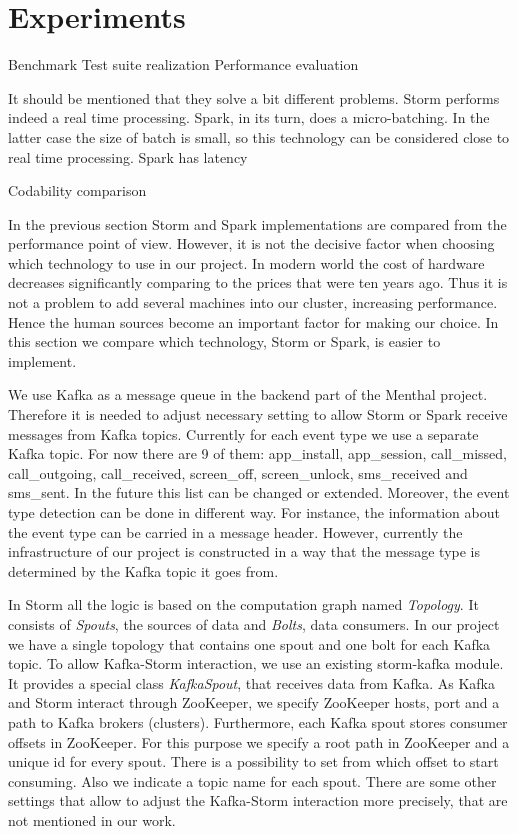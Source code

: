 \chapter{Experiments}
\label{chap:experiments}

Benchmark
Test suite realization
Performance evaluation

It should be mentioned that they solve a bit different problems.
Storm performs indeed a real time processing.
Spark, in its turn, does a micro-batching.
In the latter case the size of batch is small, so this technology can be considered close to real time processing.
Spark has latency

Codability comparison


In the previous section Storm and Spark implementations are compared from the performance point of view.
However, it is not the decisive factor when choosing which technology to use in our project.
In modern world the cost of hardware decreases significantly comparing to the prices that were ten years ago.
Thus it is not a problem to add several machines into our cluster, increasing performance.
Hence the human sources become an important factor for making our choice.
In this section we compare which technology, Storm or Spark, is easier to implement.

We use Kafka as a message queue in the backend part of the Menthal project.
Therefore it is needed to adjust necessary setting to allow Storm or Spark receive messages from Kafka topics.
Currently for each event type we use a separate Kafka topic.
For now there are 9 of them: app\_install, app\_session, call\_missed, call\_outgoing, call\_received, screen\_off, screen\_unlock, sms\_received and sms\_sent.  
In the future this list can be changed or extended.
Moreover, the event type detection can be done in different way.
For instance, the information about the event type can be carried in a message header.
However, currently the infrastructure of our project is constructed in a way that the message type is determined by the Kafka topic it goes from.

In Storm all the logic is based on the computation graph named \textit{Topology}.
It consists of \textit{Spouts}, the sources of data and \textit{Bolts}, data consumers.
In our project we have a single topology that contains one spout and one bolt for each Kafka topic.
To allow Kafka-Storm interaction, we use an existing storm-kafka module.
It provides a special class \textit{KafkaSpout}, that receives data from Kafka.
As Kafka and Storm interact through ZooKeeper, we specify ZooKeeper hosts, port and a path to Kafka brokers (clusters).
Furthermore, each Kafka spout stores consumer offsets in ZooKeeper.
For this purpose we specify a root path in ZooKeeper and a unique id for every spout.
There is a possibility to set from which offset to start consuming.
Also we indicate a topic name for each spout.
There are some other settings that allow to adjust the Kafka-Storm interaction more precisely, that are not mentioned in our work.

